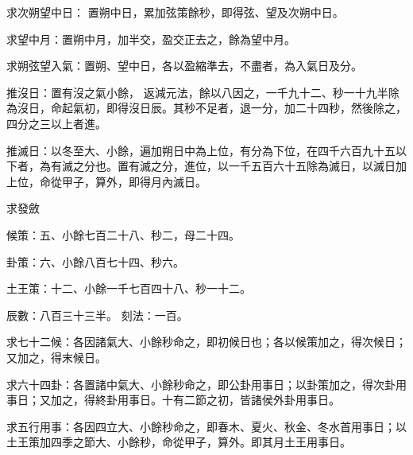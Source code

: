 \begin{pinyinscope}
求次朔望中日：
 置朔中日，累加弦策餘秒，即得弦、望及次朔中日。


求望中月：置朔中月，加半交，盈交正去之，餘為望中月。


求朔弦望入氣：置朔、望中日，各以盈縮準去，不盡者，為入氣日及分。


推沒日：置有沒之氣小餘，
 返減元法，餘以八因之，一千九十二、秒一十九半除為沒日，命起氣初，即得沒日辰。其秒不足者，退一分，加二十四秒，然後除之，四分之三以上者進。


推滅日：以冬至大、小餘，遍加朔日中為上位，有分為下位，在四千六百九十五以下者，為有滅之分也。置有滅之分，進位，以一千五百六十五除為滅日，以滅日加上位，命從甲子，算外，即得月內滅日。



 求發斂


候策：五、小餘七百二十八、秒二，母二十四。


卦策：六、小餘八百七十四、秒六。


土王策：十二、小餘一千七百四十八、秒一十二。


辰數：八百三十三半。
 刻法：一百。


求七十二候：各因諸氣大、小餘秒命之，即初候日也；各以候策加之，得次候日；又加之，得末候日。


求六十四卦：各置諸中氣大、小餘秒命之，即公卦用事日；以卦策加之，得次卦用事日；又加之，得終卦用事日。十有二節之初，皆諸侯外卦用事日。


求五行用事：各因四立大、小餘秒命之，即春木、夏火、秋金、冬水首用事日；以土王策加四季之節大、小餘秒，命從甲子，算外。即其月土王用事日。



\end{pinyinscope}

